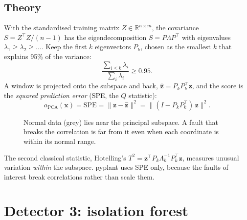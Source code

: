 \subsection{Theory}
With the standardised training matrix $Z\in\mathbb R^{n\times m}$, the
covariance $S = Z^\top Z/(n-1)$ has the eigendecomposition $S = P\Lambda
P^\top$ with eigenvalues $\lambda_1\ge\lambda_2\ge\dots$. Keep the first $k$
eigenvectors $P_k$, chosen as the smallest $k$ that explains 95\% of the
variance:
\begin{equation}
  \frac{\sum_{i\le k}\lambda_i}{\sum_i \lambda_i} \ge 0.95 .
\end{equation}
A window is projected onto the subspace and back, $\hat{\bm z} = P_kP_k^\top
\bm z$, and the score is the \emph{squared prediction error} (SPE, the $Q$
statistic):
\begin{equation}
  a_\text{PCA}(\bm x) = \text{SPE} = \lVert \bm z - \hat{\bm z} \rVert^2
  = \lVert (I - P_kP_k^\top)\,\bm z \rVert^2 .
\end{equation}

\begin{figure}[htbp]
\centering
{}
\caption{Normal data (grey) lies near the principal subspace. A fault that
breaks the correlation is far from it even when each coordinate is within its
normal range.}
\label{fig:pca}
\end{figure}

The second classical statistic, Hotelling's $T^2 = \bm z^\top P_k
\Lambda_k^{-1} P_k^\top \bm z$, measures unusual variation \emph{within} the
subspace. pyplant uses SPE only, because the faults of interest break
correlations rather than scale them.

\section{Detector 3: isolation forest}

